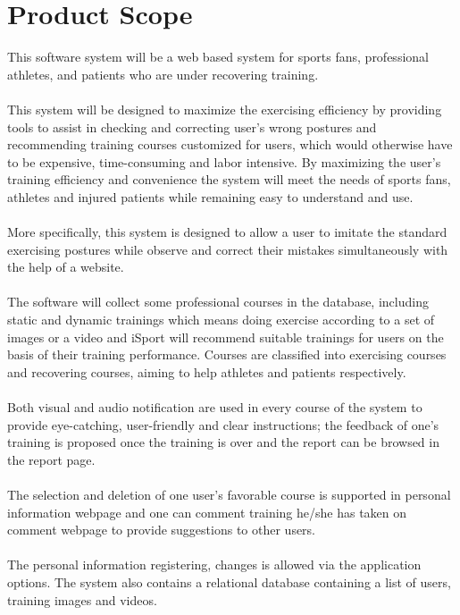\documentclass[16pt]{scrreprt}
\begin{document}
\section{Product Scope}
This software system will be a web based system for sports fans, professional athletes, and patients who are under recovering training. \\
\\
This system will be designed to maximize the exercising efficiency by providing tools to assist in checking and correcting user's wrong postures and recommending training courses customized for users, which would otherwise have to be expensive, time-consuming and labor intensive. By maximizing the user’s training efficiency and convenience the system will meet the needs of sports fans, athletes and injured patients while remaining easy to understand and use.\\
\\
More specifically, this system is designed to allow a user to imitate the standard exercising postures while observe and correct their mistakes simultaneously with the help of a website. \\
\\
The software will collect some professional courses in the database, including static and dynamic trainings which means doing exercise according to a set of images or a video and iSport will recommend suitable trainings for users on the basis of their training performance. Courses are classified into exercising courses and recovering courses, aiming to help athletes and patients respectively.\\
\\
Both visual and audio notification are used in every course of the system to provide eye-catching, user-friendly and clear instructions; the feedback of one's training is proposed once the training is over and the report can be browsed in the report page.\\
\\
The selection and deletion of one user's favorable course is supported in personal information webpage and one can comment training he/she has taken on comment webpage to provide suggestions to other users.\\
\\
 The personal information registering, changes is allowed via the application options. The system also contains a relational database containing a list of users, training images and videos.
\end{document}
